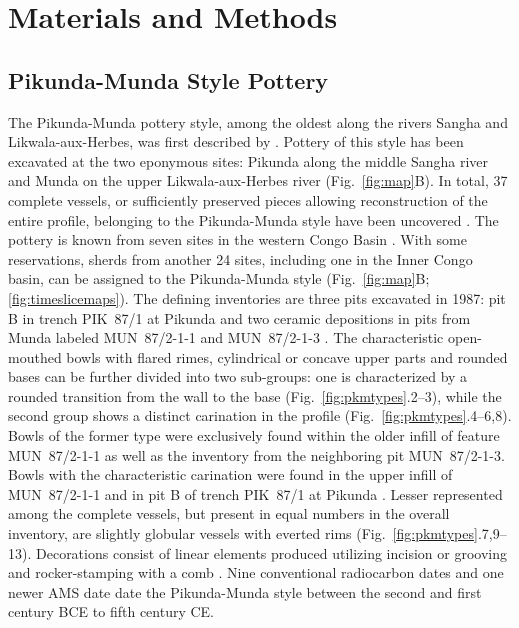 \documentclass[smallextended,natbib]{svjour3}       %
\begin{document}
\section{Materials and Methods}\label{materials}

\subsection{Pikunda-Munda Style Pottery}

The Pikunda-Munda pottery style, among the oldest along the rivers Sangha and Likwala-aux-Herbes, was first described by \citet{Eggert.1992}. Pottery of this style has been excavated at the two eponymous sites: Pikunda along the middle Sangha river and Munda on the upper Likwala-aux-Herbes river (Fig.~\ref{fig:map}B). In total, 37 complete vessels, or sufficiently preserved pieces allowing reconstruction of the entire profile, belonging to the Pikunda-Munda style have been uncovered \citep[114--115]{Seidensticker.2021e}. The pottery is known from seven sites in the western Congo Basin \citep[119--120 Fig.~49]{Seidensticker.2021e}. With some reservations, sherds from another 24 sites, including one in the Inner Congo basin, can be assigned to the Pikunda-Munda style (Fig.~\ref{fig:map}B; \ref{fig:timeslicemaps}). The defining inventories are three pits excavated in 1987: pit B in trench PIK~87/1 at Pikunda \citep[288--300]{Seidensticker.2021e} and two ceramic depositions in pits from Munda labeled MUN~87/2-1-1 and MUN~87/2-1-3 \citep[321--335]{Seidensticker.2021e}. The characteristic open-mouthed bowls with flared rimes, cylindrical or concave upper parts and rounded bases \citep[311--314]{Eggert.1993} can be further divided into two sub-groups: one is characterized by a rounded transition from the wall to the base (Fig.~\ref{fig:pkmtypes}.2--3), while the second group shows a distinct carination in the profile (Fig.~\ref{fig:pkmtypes}.4--6,8). Bowls of the former type were exclusively found within the older infill of feature MUN~87/2-1-1 as well as the inventory from the neighboring pit MUN~87/2-1-3. Bowls with the characteristic carination were found in the upper infill of MUN~87/2-1-1 and in pit B of trench PIK~87/1 at Pikunda \citep[115--117]{Seidensticker.2021e}. Lesser represented among the complete vessels, but present in equal numbers in the overall inventory, are slightly globular vessels with everted rims (Fig.~\ref{fig:pkmtypes}.7,9--13). Decorations consist of linear elements produced utilizing incision or grooving and rocker-stamping with a comb \citep[362 App.~4.12]{Seidensticker.2021e}. Nine conventional radiocarbon dates \citep[117 Fig.~48, 355--356 App.~2]{Seidensticker.2021e} and one newer AMS date \citep[Tab.~2: RICH-30864]{Seidensticker.2024} date the Pikunda-Munda style between the second and first century BCE to fifth century CE.
\end{document}
